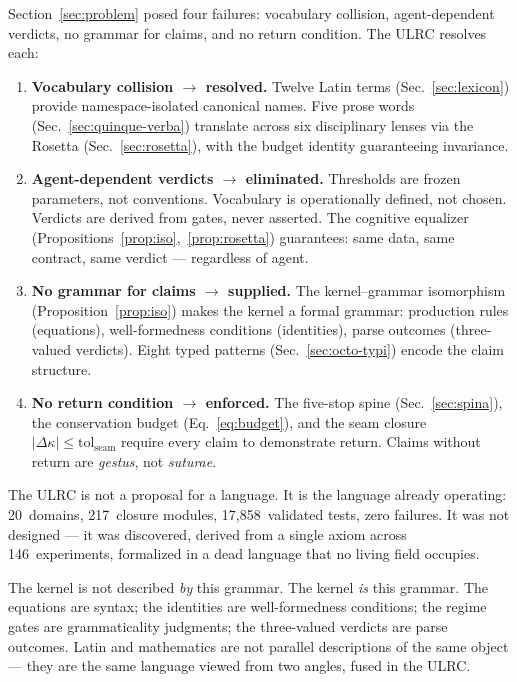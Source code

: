 \documentclass[
  aps,
  prd,
  twocolumn,
  superscriptaddress,
  nofootinbib,
  floatfix
]{revtex4-2}
\newcommand{\tolseam}{\mathrm{tol}_{\mathrm{seam}}}
\newcommand{\Logint}{\kappa}
\newcommand{\lat}[1]{\textit{#1}}
\begin{document}
Section~\ref{sec:problem} posed four failures: vocabulary
collision, agent-dependent verdicts, no grammar for claims, and
no return condition. The ULRC resolves each:

\begin{enumerate}[nosep,leftmargin=*]
\item \textbf{Vocabulary collision $\to$ resolved.}
  Twelve Latin terms (Sec.~\ref{sec:lexicon}) provide
  namespace-isolated canonical names. Five prose words
  (Sec.~\ref{sec:quinque-verba}) translate across six
  disciplinary lenses via the Rosetta
  (Sec.~\ref{sec:rosetta}), with the budget identity
  guaranteeing invariance.

\item \textbf{Agent-dependent verdicts $\to$ eliminated.}
  Thresholds are frozen parameters, not conventions.
  Vocabulary is operationally defined, not chosen.
  Verdicts are derived from gates, never asserted.
  The cognitive equalizer
  (Propositions~\ref{prop:iso},~\ref{prop:rosetta})
  guarantees: same data, same contract, same verdict ---
  regardless of agent.

\item \textbf{No grammar for claims $\to$ supplied.}
  The kernel--grammar isomorphism
  (Proposition~\ref{prop:iso}) makes the kernel a formal
  grammar: production rules (equations), well-formedness
  conditions (identities), parse outcomes (three-valued
  verdicts). Eight typed patterns
  (Sec.~\ref{sec:octo-typi}) encode the claim structure.

\item \textbf{No return condition $\to$ enforced.}
  The five-stop spine (Sec.~\ref{sec:spina}), the
  conservation budget (Eq.~\ref{eq:budget}), and the seam
  closure $|\Delta\Logint| \leq \tolseam$ require every
  claim to demonstrate return. Claims without return are
  \lat{gestus}, not \lat{suturae}.
\end{enumerate}

\noindent
The ULRC is not a proposal for a language. It is the language
already operating: 20~domains, 217~closure modules,
17,858~validated tests, zero failures. It was not designed ---
it was discovered, derived from a single axiom across
146~experiments, formalized in a dead language that no living
field occupies.

The kernel is not described \emph{by} this grammar. The kernel
\emph{is} this grammar. The equations are syntax; the identities
are well-formedness conditions; the regime gates are
grammaticality judgments; the three-valued verdicts are parse
outcomes. Latin and mathematics are not parallel descriptions
of the same object --- they are the same language viewed from
two angles, fused in the ULRC.
\end{document}
